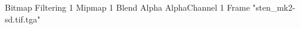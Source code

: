 {Bitmap
	{Filtering 1}
	{Mipmap 1}
	{Blend Alpha }
	{AlphaChannel 1}
	{Frame "sten_mk2-sd.tif.tga"}
}
